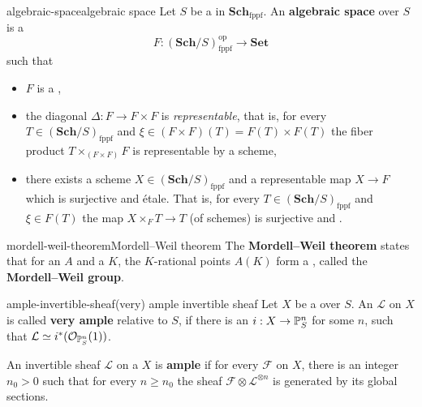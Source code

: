 \begin{topic}{algebraic-space}{algebraic space}
    Let $S$ be a  in $\textbf{Sch}_\text{fppf}$. An \textbf{algebraic space} over $S$ is a 
    \[ F : (\textbf{Sch}/S)_\text{fppf}^\text{op} \to \textbf{Set} \]
    such that
    \begin{itemize}
        \item $F$ is a ,
        \item the diagonal $\Delta : F \to F \times F$ is \textit{representable}, that is, for every $T \in (\textbf{Sch}/S)_\text{fppf}$ and $\xi \in (F \times F)(T) = F(T) \times F(T)$ the fiber product $T \times_{(F \times F)} F$ is representable by a scheme,
        \item there exists a scheme $X \in (\textbf{Sch}/S)_\text{fppf}$ and a representable map $X \to F$ which is surjective and étale. That is, for every $T \in (\textbf{Sch}/S)_\text{fppf}$ and $\xi \in F(T)$ the map $X \times_F T \to T$ (of schemes) is surjective and .
    \end{itemize}
\end{topic}

\begin{topic}{mordell-weil-theorem}{Mordell--Weil theorem}
    The \textbf{Mordell--Weil theorem} states that for an  $A$ and a  $K$, the $K$-rational points $A(K)$ form a   , called the \textbf{Mordell--Weil group}.
\end{topic}

\begin{topic}{ample-invertible-sheaf}{(very) ample invertible sheaf}
    Let $X$ be a  over $S$. An  $\mathcal{L}$ on $X$ is called \textbf{very ample} relative to $S$, if there is an  $i : X \to \mathbb{P}_S^n$ for some $n$, such that $\mathcal{L} \simeq i^*(\mathcal{O}_{\mathbb{P}_S^n}(1))$.
    
    An invertible sheaf $\mathcal{L}$ on a  $X$ is \textbf{ample} if for every  $\mathcal{F}$ on $X$, there is an integer $n_0 > 0$ such that for every $n \ge n_0$ the sheaf $\mathcal{F} \otimes \mathcal{L}^{\otimes n}$ is generated by its global sections.
\end{topic}

